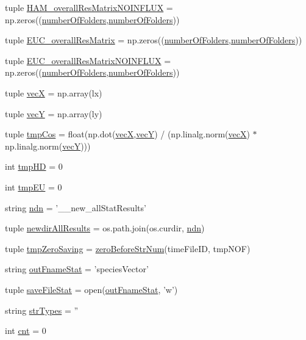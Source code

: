 \begin{DoxyCompactItemize}
\item 
tuple \hyperlink{a00097_a6ea74abf4c94200ed1b27d892ecacc97}{H\-A\-M\-\_\-overall\-Res\-Matrix\-N\-O\-I\-N\-F\-L\-U\-X} = np.\-zeros((\hyperlink{a00097_a3a2fe097086bb0f4a505fca8f53dc2b0}{number\-Of\-Folders},\hyperlink{a00097_a3a2fe097086bb0f4a505fca8f53dc2b0}{number\-Of\-Folders}))
\item 
tuple \hyperlink{a00097_a63ee1925f76a40d04495e9b35c0973d2}{E\-U\-C\-\_\-overall\-Res\-Matrix} = np.\-zeros((\hyperlink{a00097_a3a2fe097086bb0f4a505fca8f53dc2b0}{number\-Of\-Folders},\hyperlink{a00097_a3a2fe097086bb0f4a505fca8f53dc2b0}{number\-Of\-Folders}))
\item 
tuple \hyperlink{a00097_a4f2ecc559d2c5d79bb138a2e8ced8127}{E\-U\-C\-\_\-overall\-Res\-Matrix\-N\-O\-I\-N\-F\-L\-U\-X} = np.\-zeros((\hyperlink{a00097_a3a2fe097086bb0f4a505fca8f53dc2b0}{number\-Of\-Folders},\hyperlink{a00097_a3a2fe097086bb0f4a505fca8f53dc2b0}{number\-Of\-Folders}))
\item 
tuple \hyperlink{a00097_a55e7171c96f320a08ad29f21ad5faf9a}{vec\-X} = np.\-array(lx)
\item 
tuple \hyperlink{a00097_aaa4ad55a8fe44bfc5a386dff027886b0}{vec\-Y} = np.\-array(ly)
\item 
tuple \hyperlink{a00097_a547703ec10e432928645bbe8d226dceb}{tmp\-Cos} = float(np.\-dot(\hyperlink{a00097_a55e7171c96f320a08ad29f21ad5faf9a}{vec\-X},\hyperlink{a00097_aaa4ad55a8fe44bfc5a386dff027886b0}{vec\-Y}) / (np.\-linalg.\-norm(\hyperlink{a00097_a55e7171c96f320a08ad29f21ad5faf9a}{vec\-X}) $\ast$ np.\-linalg.\-norm(\hyperlink{a00097_aaa4ad55a8fe44bfc5a386dff027886b0}{vec\-Y})))
\item 
int \hyperlink{a00097_a35b7af9eb7cd962d33c5d56eae794c7b}{tmp\-H\-D} = 0
\item 
int \hyperlink{a00097_a9019a56cfd992899ffc519204307a8ae}{tmp\-E\-U} = 0
\item 
string \hyperlink{a00097_ab0e0a55161ee1fd9fb0f086a328f67b7}{ndn} = '\-\_\-\_\-new\-\_\-all\-Stat\-Results'
\item 
tuple \hyperlink{a00097_aaf0f6fcbaaf97dcff16b62e86df0209c}{newdir\-All\-Results} = os.\-path.\-join(os.\-curdir, \hyperlink{a00097_ab0e0a55161ee1fd9fb0f086a328f67b7}{ndn})
\item 
tuple \hyperlink{a00097_ae86fc9dc3283934244ec28446445f722}{tmp\-Zero\-Saving} = \hyperlink{a00097_a52efd37e3719214b7a4c7c46842ae229}{zero\-Before\-Str\-Num}(time\-File\-I\-D, tmp\-N\-O\-F)
\item 
string \hyperlink{a00097_a05e902a00f3333a303563029c80605de}{out\-Fname\-Stat} = 'species\-Vector'
\item 
tuple \hyperlink{a00097_a372b8cd0e4d3200958e9c61e3a276fb1}{save\-File\-Stat} = open(\hyperlink{a00097_a05e902a00f3333a303563029c80605de}{out\-Fname\-Stat}, 'w')
\item 
string \hyperlink{a00097_a80aeec3ef5cc335351588c6f7c4b76cb}{str\-Types} = ''
\item 
int \hyperlink{a00097_aabada0bdbcd7fb71d37a9310d32f0a28}{cnt} = 0
\end{DoxyCompactItemize}


